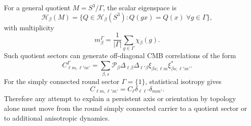 \documentclass[aps,prd,onecolumn,superscriptaddress,longbibliography,nofootinbib,notitlepage]{revtex4-2}
\renewcommand{\arraystretch}{1.17}
\begin{document}
For a general quotient $M=S^3/\Gamma$, the scalar eigenspace is
\begin{equation}
  \mathcal H_\beta(M)=
  \{Q\in\mathcal H_\beta(S^3):Q(gx)=Q(x)\;\forall g\in\Gamma\},
\end{equation}
with multiplicity
\begin{equation}
  m_\beta^\Gamma
  =\frac{1}{|\Gamma|}\sum_{g\in\Gamma}\chi_\beta(g).
\end{equation}
Such quotient sectors can generate off-diagonal CMB correlations of the form
\begin{equation}
  C_{\ell m,\ell'm'}^\Gamma
  =\sum_{\beta,s}\mathcal P_\beta
  \Delta_{\ell\beta}\Delta_{\ell'\beta}
  \xi_{\beta s;\ell m}\xi^*_{\beta s;\ell'm'} .
\end{equation}
For the simply connected round sector $\Gamma=\{1\}$, statistical isotropy gives
\begin{equation}
  C_{\ell m,\ell'm'}=C_\ell\delta_{\ell\ell'}\delta_{mm'}.
\end{equation}
Therefore any attempt to explain a persistent axis or orientation by topology
alone must move from the round simply connected carrier to a quotient sector or
to additional anisotropic dynamics.

\begin{table}[htbp]
\centering
\caption{Comparison between the simply connected round carrier used in this paper and the Poincar\'e dodecahedral quotient sector. At fixed curvature radius $R$, the quotient changes the allowed global modes and volume, not the local sectional curvature $K=1/R^2$.}
\label{tab:s3-pds-comparison}
\small
\renewcommand{\arraystretch}{1.16}
\end{table}
\end{document}
